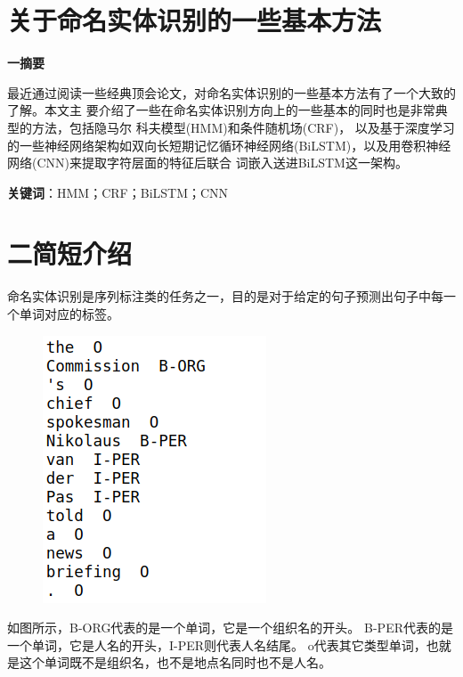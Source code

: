 \documentclass[openany,oneside]{ctexbook}
\begin{document}
\makeatletter
\newcommand\Csub{\@startsection{subsection}{2}%
 {0pt}{-\baselineskip}{.2\baselineskip}%
 {\centering\itshape}}
\newcommand\Lsub{\@startsection{subsection}{2}%
 {0pt}{-\baselineskip}{.2\baselineskip}%
 {\raggedright\sffamily}}
\newcommand\Rsub{\@startsection{subsection}{2}%
 {0pt}{-\baselineskip}{.2\baselineskip}%
 {\raggedleft\MakeUppercase}}
\newcommand\Hsub{\@startsection{subsection}{2}%
 {0pt}{-\baselineskip}{.2\baselineskip}%
 {\hrule\medskip\itshape}}
\makeatother

\pagestyle{empty} %

\mainmatter
\frontmatter
\renewcommand{\thepage}{\arabic{page}} %



\setcounter{page}{1}
\chapter{\sanhao\hei \quad 关于命名实体识别的一些基本方法}
\begin{center}
   
    {\textbf{\sihao\hei \quad 一\quad 摘要}}
\end{center}

最近通过阅读一些经典顶会论文，对命名实体识别的一些基本方法有了一个大致的了解。本文主
要介绍了一些在命名实体识别方向上的一些基本的同时也是非常典型的方法，包括隐马尔
科夫模型(HMM)和条件随机场(CRF)，
以及基于深度学习的一些神经网络架构如双向长短期记忆循环神经网络(BiLSTM)，以及用卷积神经网络(CNN)来提取字符层面的特征后联合
词嵌入送进BiLSTM这一架构。

{\bfseries 关键词}：HMM；CRF；BiLSTM；CNN
\newpage

\chapter{\sihao\hei 二\quad 简短介绍}
命名实体识别是序列标注类的任务之一，目的是对于给定的句子预测出句子中每一个单词对应的标签。
\begin{figure}[htp]
    \centering
    \includegraphics[scale=0.5]{data_print.png}
\end{figure}
如图所示，B-ORG代表的是一个单词，它是一个组织名的开头。
B-PER代表的是一个单词，它是人名的开头，I-PER则代表人名结尾。
o代表其它类型单词，也就是这个单词既不是组织名，也不是地点名同时也不是人名。
\end{document}
